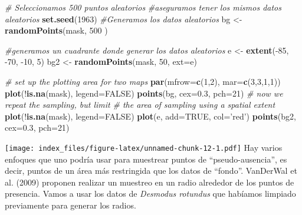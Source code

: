 \documentclass[]{article}
\newenvironment{Shaded}{\begin{snugshade}}{\end{snugshade}}
\newcommand{\KeywordTok}[1]{\textcolor[rgb]{0.13,0.29,0.53}{\textbf{{#1}}}}
\newcommand{\DataTypeTok}[1]{\textcolor[rgb]{0.13,0.29,0.53}{{#1}}}
\newcommand{\DecValTok}[1]{\textcolor[rgb]{0.00,0.00,0.81}{{#1}}}
\newcommand{\FloatTok}[1]{\textcolor[rgb]{0.00,0.00,0.81}{{#1}}}
\newcommand{\StringTok}[1]{\textcolor[rgb]{0.31,0.60,0.02}{{#1}}}
\newcommand{\CommentTok}[1]{\textcolor[rgb]{0.56,0.35,0.01}{\textit{{#1}}}}
\newcommand{\OtherTok}[1]{\textcolor[rgb]{0.56,0.35,0.01}{{#1}}}
\newcommand{\NormalTok}[1]{{#1}}
\begin{document}
\begin{Shaded}
\begin{Highlighting}[]
\CommentTok{# Seleccionamos 500 puntos aleatorios}
\CommentTok{#aseguramos tener los mismos datos aleatorios}
\KeywordTok{set.seed}\NormalTok{(}\DecValTok{1963}\NormalTok{)}
\CommentTok{#Generamos los datos aleatorios}
\NormalTok{bg <-}\StringTok{ }\KeywordTok{randomPoints}\NormalTok{(mask, }\DecValTok{500} \NormalTok{) }

\CommentTok{#generamos un cuadrante donde generar los datos aleatorios}
\NormalTok{e <-}\StringTok{ }\KeywordTok{extent}\NormalTok{(-}\DecValTok{85}\NormalTok{, -}\DecValTok{70}\NormalTok{, -}\DecValTok{10}\NormalTok{, }\DecValTok{5}\NormalTok{)}
\NormalTok{bg2 <-}\StringTok{ }\KeywordTok{randomPoints}\NormalTok{(mask, }\DecValTok{50}\NormalTok{, }\DataTypeTok{ext=}\NormalTok{e)}

\CommentTok{# set up the plotting area for two maps}
\KeywordTok{par}\NormalTok{(}\DataTypeTok{mfrow=}\KeywordTok{c}\NormalTok{(}\DecValTok{1}\NormalTok{,}\DecValTok{2}\NormalTok{), }\DataTypeTok{mar=}\KeywordTok{c}\NormalTok{(}\DecValTok{3}\NormalTok{,}\DecValTok{3}\NormalTok{,}\DecValTok{1}\NormalTok{,}\DecValTok{1}\NormalTok{))}
\KeywordTok{plot}\NormalTok{(!}\KeywordTok{is.na}\NormalTok{(mask), }\DataTypeTok{legend=}\OtherTok{FALSE}\NormalTok{)}
\KeywordTok{points}\NormalTok{(bg, }\DataTypeTok{cex=}\FloatTok{0.3}\NormalTok{, }\DataTypeTok{pch=}\DecValTok{21}\NormalTok{)}
\CommentTok{# now we repeat the sampling, but limit}
\CommentTok{# the area of sampling using a spatial extent}
\KeywordTok{plot}\NormalTok{(!}\KeywordTok{is.na}\NormalTok{(mask), }\DataTypeTok{legend=}\OtherTok{FALSE}\NormalTok{)}
\KeywordTok{plot}\NormalTok{(e, }\DataTypeTok{add=}\OtherTok{TRUE}\NormalTok{, }\DataTypeTok{col=}\StringTok{'red'}\NormalTok{)}
\KeywordTok{points}\NormalTok{(bg2, }\DataTypeTok{cex=}\FloatTok{0.3}\NormalTok{, }\DataTypeTok{pch=}\DecValTok{21}\NormalTok{)}
\end{Highlighting}
\end{Shaded}

\texttt{[image: index\_files/figure-latex/unnamed-chunk-12-1.pdf]} Hay
varios enfoques que uno podría usar para muestrear puntos de
``pseudo-ausencia'', es decir, puntos de un área más restringida que los
datos de ``fondo''. VanDerWal et al. (2009) proponen realizar un
muestreo en un radio alrededor de los puntos de presencia. Vamos a usar
los datos de \emph{Desmodus rotundus} que habíamos limpiado previamente
para generar los radios.
\end{document}
